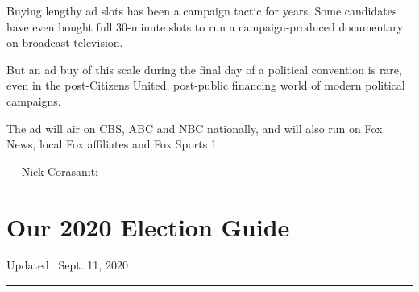 Buying lengthy ad slots has been a campaign tactic for years. Some
candidates have even bought full 30-minute slots to run a
campaign-produced documentary on broadcast television.

But an ad buy of this scale during the final day of a political
convention is rare, even in the post-Citizens United, post-public
financing world of modern political campaigns.

The ad will air on CBS, ABC and NBC nationally, and will also run on Fox
News, local Fox affiliates and Fox Sports 1.

--- \href{https://www.nytimes3xbfgragh.onion/by/nick-corasaniti}{Nick
Corasaniti}

\hypertarget{our-2020-election-guide}{%
\section{Our 2020 Election Guide}\label{our-2020-election-guide}}

Updated ~Sept. 11, 2020

\begin{center}\rule{0.5\linewidth}{\linethickness}\end{center}

